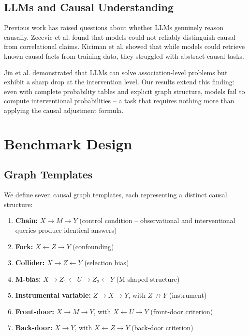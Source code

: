\documentclass[11pt,a4paper]{article}
\begin{document}
\subsection{LLMs and Causal Understanding}

Previous work has raised questions about whether LLMs genuinely reason causally. Zecevic et al. \cite{zecevic2023causal} found that models could not reliably distinguish causal from correlational claims. Kiciman et al. \cite{kiciman2024causal} showed that while models could retrieve known causal facts from training data, they struggled with abstract causal tasks.

Jin et al. \cite{jin2024cladder} demonstrated that LLMs can solve association-level problems but exhibit a sharp drop at the intervention level. Our results extend this finding: even with complete probability tables and explicit graph structure, models fail to compute interventional probabilities -- a task that requires nothing more than applying the causal adjustment formula.

\section{Benchmark Design}

\subsection{Graph Templates}

We define seven causal graph templates, each representing a distinct causal structure:

\begin{enumerate}
  \item \textbf{Chain:} $X \rightarrow M \rightarrow Y$ (control condition -- observational and interventional queries produce identical answers)
  \item \textbf{Fork:} $X \leftarrow Z \rightarrow Y$ (confounding)
  \item \textbf{Collider:} $X \rightarrow Z \leftarrow Y$ (selection bias)
  \item \textbf{M-bias:} $X \rightarrow Z_1 \leftarrow U \rightarrow Z_2 \leftarrow Y$ (M-shaped structure)
  \item \textbf{Instrumental variable:} $Z \rightarrow X \rightarrow Y$, with $Z \not\rightarrow Y$ (instrument)
  \item \textbf{Front-door:} $X \rightarrow M \rightarrow Y$, with $X \leftarrow U \rightarrow Y$ (front-door criterion)
  \item \textbf{Back-door:} $X \rightarrow Y$, with $X \leftarrow Z \rightarrow Y$ (back-door criterion)
\end{enumerate}
\end{document}
